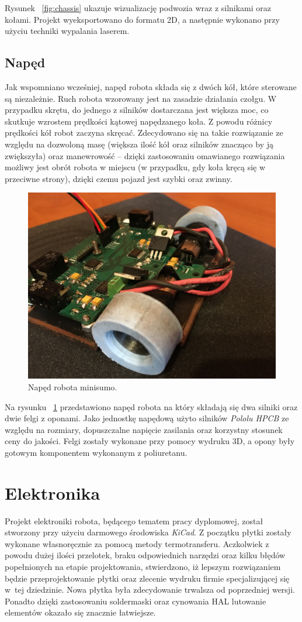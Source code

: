 Rysunek ~\ref{fig:chassis} ukazuje wizualizację podwozia wraz z silnikami oraz kołami. Projekt wyeksportowano do formatu 2D, a następnie wykonano przy użyciu techniki wypalania laserem. 

\subsection{Napęd}
Jak wspomniano wcześniej, napęd robota składa się z dwóch kół, które sterowane są niezależnie. Ruch robota wzorowany jest na zasadzie działania czołgu. W przypadku skrętu, do jednego z silników dostarczana jest większa moc, co skutkuje wzrostem prędkości kątowej napędzanego koła. Z powodu różnicy prędkości kół robot zaczyna skręcać. Zdecydowano się na takie rozwiązanie ze względu na dozwoloną masę (większa ilość kół oraz silników znacząco by ją zwiększyła) oraz manewrowość – dzięki zastosowaniu omawianego rozwiązania możliwy jest obrót robota w miejscu (w przypadku, gdy koła kręcą się w przeciwne strony), dzięki czemu pojazd jest szybki oraz zwinny. 

\begin{figure}[H]
	\centering
		\includegraphics[width=0.75\linewidth]{pic04/drive.JPG}
	\caption{Napęd robota minisumo.}
	\label{fig:drive}	
\end{figure}

Na rysunku ~\ref{fig:drive} przedstawiono napęd robota na który składają się dwa silniki oraz dwie felgi z oponami. Jako jednostkę napędową użyto silników \textit{Pololu HPCB} ze względu  na rozmiary, dopuszczalne napięcie zasilania oraz korzystny stosunek ceny do jakości. Felgi zostały wykonane przy pomocy wydruku 3D, a opony były gotowym komponentem wykonanym z poliuretanu.

\section{Elektronika}
Projekt elektroniki robota, będącego tematem pracy dyplomowej, został stworzony przy użyciu darmowego środowiska \textit{KiCad}. Z początku płytki zostały wykonane własnoręcznie za pomocą metody termotransferu. Aczkolwiek z powodu dużej ilości przelotek, braku odpowiednich narzędzi oraz kilku błędów popełnionych na etapie projektowania, stwierdzono, iż lepszym rozwiązaniem będzie przeprojektowanie płytki oraz zlecenie wydruku firmie specjalizującej się w~tej dziedzinie. Nowa płytka była zdecydowanie trwalsza od poprzedniej wersji. Ponadto dzięki zastosowaniu soldermaski oraz cynowania HAL lutowanie elementów okazało się znacznie łatwiejsze.  

